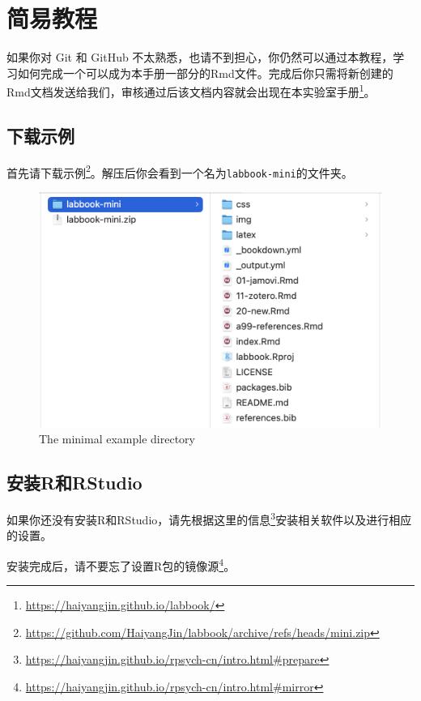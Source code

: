 \documentclass[]{ctexbook}
\renewcommand{\href}[2]{#2\footnote{\url{#1}}}
\theoremstyle{definition}
\theoremstyle{definition}
\theoremstyle{definition}
\theoremstyle{definition}
\theoremstyle{remark}
\begin{document}
\section{简易教程}\label{ux7b80ux6613ux6559ux7a0b}

如果你对 Git 和 GitHub 不太熟悉，也请不到担心，你仍然可以通过本教程，学习如何完成一个可以成为本手册一部分的Rmd文件。完成后你只需将新创建的Rmd文档发送给我们，审核通过后该文档内容就会出现在\href{https://haiyangjin.github.io/labbook/}{本实验室手册}。

\subsection{下载示例}\label{ux4e0bux8f7dux793aux4f8b}

首先请下载\href{https://github.com/HaiyangJin/labbook/archive/refs/heads/mini.zip}{示例}。解压后你会看到一个名为\texttt{labbook-mini}的文件夹。

\begin{figure}

{\centering \includegraphics[width=0.7\linewidth]{img/contribute/mini_dir} 

}

\caption{The minimal example directory}\label{fig:contri-mini-dir}
\end{figure}

\subsection{安装R和RStudio}\label{ux5b89ux88c5rux548crstudio}

如果你还没有安装R和RStudio，请先根据\href{https://haiyangjin.github.io/rpsych-cn/intro.html\#prepare}{这里的信息}安装相关软件以及进行相应的设置。

安装完成后，请不要忘了\href{https://haiyangjin.github.io/rpsych-cn/intro.html\#mirror}{设置R包的镜像源}。
\end{document}
